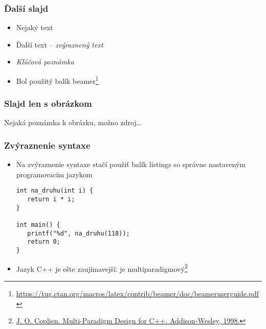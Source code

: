 \documentclass{beamer}
\newcommand{\footcite}[1]{\footnote{\tiny #1}}
\newcommand{\emp}[1]{\textit{\alert{#1}}}
\begin{document}
\begin{frame}[fragile=singleslide]\frametitle{Ďalší slajd}
\begin{itemize}
\item Nejaký text
\item Ďalší text -- \emph{zvýraznený text}
\item \emp{Kľúčová poznámka} %

\item Bol použitý balík beamer\footcite{\url{https://tug.ctan.org/macros/latex/contrib/beamer/doc/beameruserguide.pdf}}
\end{itemize}
\end{frame}


\begin{frame}[fragile=singleslide]\frametitle{Slajd len s obrázkom}

{\tiny Nejaká poznámka k obrázku, možno zdroj\ldots}
\end{frame}


\begin{frame}[fragile=singleslide]\frametitle{Zvýraznenie syntaxe}
\begin{itemize}
\item Na zvýraznenie syntaxe stačí použiť balík listings so správne nastaveným programovacím jazykom
\begin{lstlisting}
int na_druhu(int i) {
   return i * i;
}

int main() {
   printf("%d", na_druhu(118));
   return 0;
}
\end{lstlisting}

\item Jazyk C++ je ešte zaujímavejší: je multiparadigmový\footcite{\url{J. O. Coplien. Multi-Paradigm Design for C++. Addison-Wesley, 1998.}}
\end{itemize}
\end{frame}
\end{document}
